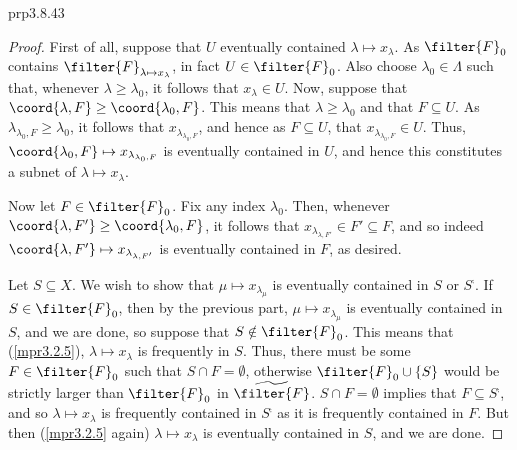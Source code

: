 \begin{prp}{}{prp3.8.43}
\begin{proof}
First of all, suppose that $U$ eventually contained $\lambda \mapsto x_{\lambda}$.  As $\filter{F}_0$ contains $\filter{F}_{\lambda \mapsto x_{\lambda}}$, in fact $U\in \filter{F}_0$.  Also choose $\lambda _0\in \Lambda$ such that, whenever $\lambda \geq \lambda _0$, it follows that $x_{\lambda}\in U$.  Now, suppose that $\coord{\lambda ,F}\geq \coord{\lambda _0,F}$.  This means that $\lambda \geq \lambda _0$ and that $F\subseteq U$.  As $\lambda _{\lambda _0,F}\geq \lambda _0$, it follows that $x_{\lambda _{\lambda _0,F}}$, and hence as $F\subseteq U$, that $x_{\lambda _{\lambda _0,F}}\in U$.  Thus, $\coord{\lambda _0,F}\mapsto x_{\lambda _{\lambda _0,F}}$ is eventually contained in $U$, and hence this constitutes a subnet of $\lambda \mapsto x_{\lambda}$.

Now let $F\in \filter{F}_0$.  Fix any index $\lambda _0$.  Then, whenever $\coord{\lambda ,F'}\geq \coord{\lambda _0,F}$, it follows that $x_{\lambda _{\lambda ,F'}}\in F'\subseteq F$, and so indeed $\coord{\lambda ,F'}\mapsto x_{\lambda _{\lambda ,F'}}$ is eventually contained in $F$, as desired.


Let $S\subseteq X$.  We wish to show that $\mu \mapsto x_{\lambda _{\mu}}$ is eventually contained in $S$ or $S^{\comp}$.  If $S\in \filter{F}_0$, then by the previous part, $\mu \mapsto x_{\lambda _{\mu}}$ is eventually contained in $S$, and we are done, so suppose that $S\notin \filter{F}_0$.  This means that (\cref{mpr3.2.5}), $\lambda \mapsto x_{\lambda}$ is frequently in $S$.  Thus, there must be some $F\in \filter{F}_0$ such that $S\cap F=\emptyset$, otherwise $\filter{F}_0\cup \{ S\}$ would be strictly larger than $\filter{F}_0$ in $\widetilde{\filter{F}}$.  $S\cap F=\emptyset$ implies that $F\subseteq S^{\comp}$, and so $\lambda \mapsto x_{\lambda}$ is frequently contained in $S^{\comp}$ as it is frequently contained in $F$.  But then (\cref{mpr3.2.5} again) $\lambda \mapsto x_{\lambda}$ is eventually contained in $S$, and we are done. 
\end{proof}
\end{prp}
